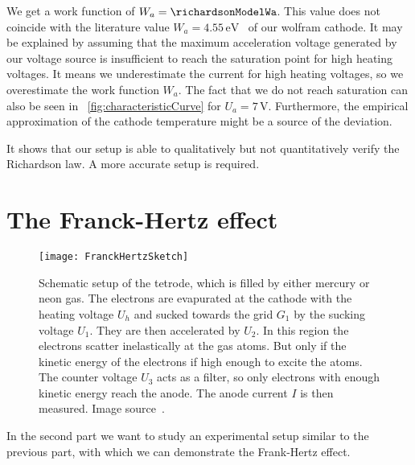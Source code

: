 \documentclass[a4paper,10pt,twocolumn]{article}
\newcommand{\wolframWa}{4.55\, \mathrm{eV}}
\newcommand{\volt}{\, \mathrm{V}}
\newcommand{\sevenV}{7 \volt}
\begin{document}
    We get a work function of $W_a = \richardsonModelWa$.
    This value does not coincide with the literature value $W_a = \wolframWa$~\cite{wolfram} of our wolfram cathode.
    It may be explained by assuming that the maximum acceleration voltage generated by our voltage source is
    insufficient to reach the saturation point for high heating voltages.
    It means we underestimate the current for high heating voltages, so we overestimate the work function $W_a$.
    The fact that we do not reach saturation can also be seen in ~\autoref{fig:characteristicCurve} for $U_a = \sevenV$.
    Furthermore, the empirical approximation of the cathode temperature might be a source of the deviation.
    
    It shows that our setup is able to qualitatively but not quantitatively verify the Richardson law.
    A more accurate setup is required.
    
    \section{The Franck-Hertz effect}

    \begin{figure}[htbp]
        \texttt{[image: FranckHertzSketch]}
        \center
        \caption{Schematic setup of the tetrode, which is filled by either mercury or neon gas.
        The electrons are evapurated at the cathode with the heating voltage $U_h$ and sucked towards
        the grid $G_1$ by the sucking voltage $U_1$.
        They are then accelerated by $U_2$.
        In this region the electrons scatter inelastically at the gas atoms. 
        But only if the kinetic energy of the electrons if high enough to excite the atoms.
        The counter voltage $U_3$ acts as a filter, so only electrons with enough kinetic energy reach
        the anode.
        The anode current $I$ is then measured.
        Image source~\cite{frankHertzSource}.
        }
        \label{fig:franckHertzSketch}
    \end{figure}
    
    In the second part we want to study an experimental setup similar to the previous part,
    with which we can demonstrate the Frank-Hertz effect.
    
\end{document}
